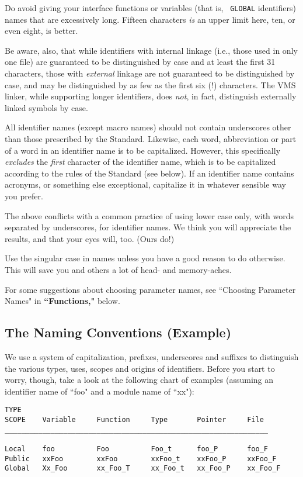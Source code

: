 Do avoid giving your interface functions or variables (that is, {\tt
GLOBAL} identifiers) names that are excessively long.  Fifteen
characters {\em is} an upper limit here, ten, or even eight, is
better.



Be aware, also, that while identifiers with internal linkage (i.e.,
those used in only one file) are guaranteed to be distinguished by
case and at least the first 31 characters, those with {\em external}
linkage are not guaranteed to be distinguished by case, and may be
distinguished by as few as the first six (!) characters.  The VMS
linker, while supporting longer identifiers, does {\em not}, in fact,
distinguish externally linked symbols by case.

All identifier names (except macro names) should not contain
underscores other than those prescribed by the Standard.  Likewise,
each word, abbreviation or part of a word in an identifier name is to
be capitalized.  However, this specifically {\em excludes} the {\em
first} character of the identifier name, which is to be capitalized
according to the rules of the Standard (see below).  If an identifier
name contains acronyms, or something else exceptional, capitalize it
in whatever sensible way you prefer.

The above conflicts with a common practice of using lower case only,
with words separated by underscores, for identifier names.  We think
you will appreciate the results, and that your eyes will, too.  (Ours
do!)

Use the singular case in names unless you have a good reason to do
otherwise.  This will save you and others a lot of head- and
memory-aches.

For some suggestions about choosing parameter names, see ``Choosing Parameter
Names" in {\bf ``Functions,"} below.

\subsection{The Naming Conventions (Example)}

We use a system of capitalization, prefixes, underscores and suffixes
to distinguish the various types, uses, scopes and origins of
identifiers.  Before you start to worry, though, take a look at the
following chart of examples (assuming an identifier name of ``foo" and
a module name of ``xx"):

\begin{verbatim}
TYPE
SCOPE    Variable     Function     Type       Pointer     File
_______________________________________________________________

Local    foo          Foo          Foo_t      foo_P       foo_F
Public   xxFoo        xxFoo        xxFoo_t    xxFoo_P     xxFoo_F
Global   Xx_Foo       xx_Foo_T     xx_Foo_t   xx_Foo_P    xx_Foo_F
\end{verbatim}

